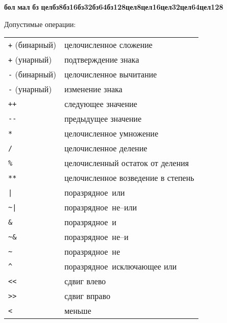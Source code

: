\documentclass[10pt]{report}
\begin{document}
\noindent\rbo\textbf{бол}\kleene{}\sor\textbf{ мал}\kleene\!\!\rbc \textbf{ бз}\optional \textbf{ цел}\sor\textbf{бз8}\sor\textbf{бз16}\sor\textbf{бз32}\sor\textbf{бз64}\sor\textbf{бз128}\sor\textbf{цел8}\sor\textbf{цел16}\sor\phantom{|}\textbf{цел32}\sor\textbf{цел64}\sor\textbf{цел128}

Допустимые операции:
\begin{longtable}{ll}
 	\texttt{+} (бинарный)   & целочисленное сложение                            \\
 	\texttt{+} (унарный)    & подтверждение знака                               \\
 	\texttt{-} (бинарный)   & целочисленное вычитание                           \\
 	\texttt{-} (унарный)    & изменение знака                                   \\
 	\texttt{+{}+}           & следующее значение                                \\
 	\texttt{-{}-}           & предыдущее значение                               \\
 	\texttt{*}              & целочисленное умножение                           \\
 	\texttt{/}              & целочисленное деление                             \\
 	\texttt{\%}             & целочисленный остаток от деления                  \\
 	\texttt{**}             & целочисленное возведение в степень                \\
 	\texttt{|}              & поразрядное\ \glqq или\grqq\                      \\
 	\texttt{\~{ }|}         & поразрядное\ \glqq не--или\grqq\                  \\
 	\texttt{\&}             & поразрядное\ \glqq и\grqq\                        \\
 	\texttt{\~{ }\&}        & поразрядное\ \glqq не--и\grqq\                    \\
 	\texttt{\~{ }}          & поразрядное\ \glqq не\grqq\                       \\
 	\texttt{\^{ }}          & поразрядное\ \glqq исключающее или\grqq\          \\
 	\texttt{<{}<}           & сдвиг влево                                       \\
 	\texttt{>{}>}           & сдвиг вправо                                      \\
 	\texttt{<}              & меньше                                            \\

\end{longtable}
\end{document}
